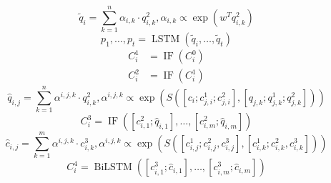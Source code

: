 \documentclass[a4paper,UTF8]{article}
\numberwithin{equation}{section}
\begin{document}
			\begin{equation}
				\tilde{q}_{i}=\sum_{k=1}^{n} \alpha_{i, k} \cdot q_{i, k}^{2}, \alpha_{i, k} \propto \exp \left(w^{T} q_{i, k}^{2}\right)
				\end{equation}
				\begin{equation}
					p_{1}, \ldots, p_{t}=\operatorname{LSTM}\left(\tilde{q}_{i}, \ldots, \tilde{q}_{t}\right)
					\end{equation}
					\begin{equation}
					\begin{aligned} C_{i}^{1} &=\operatorname{IF}\left(C_{i}^{0}\right) \\ C_{i}^{2} &=\operatorname{IF}\left(C_{i}^{1}\right) \end{aligned}
					\end{equation}
					\begin{equation}
						\hat{q}_{i, j}=\sum_{k=1}^{n} \alpha^{i, j, k} \cdot q_{i, k}^{2}, \alpha^{i, j, k} \propto \exp \left(S\left(\left[c_{i} ; c_{j, i}^{1} ; c_{j, i}^{2}\right],\left[q_{j, k} ; q_{j, k}^{1} ; q_{j, k}^{2}\right]\right)\right)
						\end{equation}
						\begin{equation}
							C_{i}^{3}=\operatorname{IF}\left(\left[c_{i, 1}^{2} ; \hat{q}_{i, 1}\right], \ldots,\left[c_{i, m}^{2} ; \hat{q}_{i, m}\right]\right)
							\end{equation}
							\begin{equation}
								\hat{c}_{i, j}=\sum_{k=1}^{m} \alpha^{i, j, k} \cdot c_{i, k}^{3}, \alpha^{i, j, k} \propto \exp \left(S\left(\left[c_{i, j}^{1} ; c_{i, j}^{2}, c_{i, j}^{3}\right],\left[c_{i, k}^{1} ; c_{i, k}^{2}, c_{i, k}^{3}\right]\right)\right)
								\end{equation}
								\begin{equation}
									C_{i}^{4}=\operatorname{BiLSTM}\left(\left[c_{i, 1}^{3} ; \hat{c}_{i, 1}\right], \ldots,\left[c_{i, m}^{3} ; \hat{c}_{i, m}\right]\right)
									\end{equation}
\end{document}
